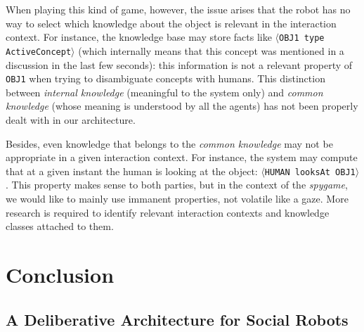 \documentclass[preprint,3p,times]{elsarticle}
\newcommand{\concept}[1]{{\small \texttt{#1}}}
\newcommand{\stmt}[1]{{\footnotesize\tt$\langle$#1\relax$\rangle$}}
\begin{document}
When playing this kind of game, however, the issue arises that the robot has no
way to select which knowledge about the object is relevant in the interaction
context. For instance, the knowledge base may store facts like \stmt{OBJ1 type
ActiveConcept} (which internally means that this concept was mentioned in a
discussion in the last few seconds): this information is not a relevant
property of \concept{OBJ1} when trying to disambiguate concepts with humans.
This distinction between \emph{internal knowledge} (meaningful to
the system only) and \emph{common knowledge} (whose meaning is understood by
all the agents) has not been properly dealt with in our architecture.

Besides, even knowledge that belongs to the \emph{common knowledge} may not be
appropriate in a given interaction context. For instance, the system may
compute that at a given instant the human is looking at the object: \stmt{HUMAN
looksAt OBJ1}. This property makes sense to both parties, but in the context of
the \emph{spygame}, we would like to mainly use immanent properties, not
volatile like a gaze. More research is required to identify relevant
interaction contexts and knowledge classes attached to them.

\section{Conclusion}
\label{sect|conclusion}

\subsection{A Deliberative Architecture for Social Robots}
\end{document}
